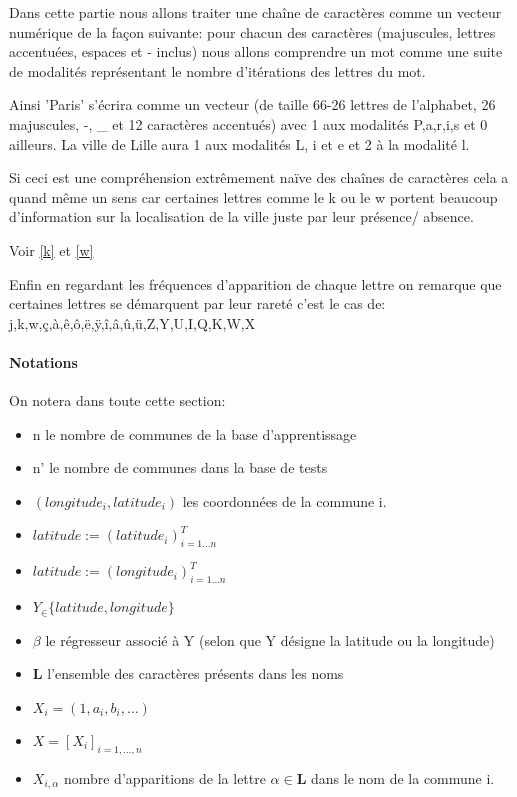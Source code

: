 \documentclass[french]{article}%
\begin{document}
		Dans cette partie nous allons traiter une chaîne de caractères comme un vecteur numérique de la façon suivante: pour chacun des caractères (majuscules, lettres accentuées, espaces et - inclus) nous allons comprendre un mot comme une suite de modalités représentant le nombre d'itérations des lettres du mot.
		
		Ainsi 'Paris' s'écrira comme un vecteur (de taille 66-26 lettres de l'alphabet, 26 majuscules, -, \_ et 12 caractères accentués) avec 1 aux modalités P,a,r,i,s et 0 ailleurs.
		La ville de Lille aura 1 aux modalités L, i et e et 2 à la modalité l.
		
		Si ceci est une compréhension extrêmement naïve des chaînes de caractères cela a quand même un sens car certaines lettres comme le k ou le w portent beaucoup d'information sur la localisation de la ville juste par leur présence/ absence.
		
		Voir \autoref{k} et \autoref{w}
		
		Enfin en regardant les fréquences d'apparition de chaque lettre on remarque que certaines lettres se démarquent par leur rareté c'est le cas de:  j,k,w,ç,à,ê,ô,ë,ÿ,î,â,û,ü,Z,Y,U,I,Q,K,W,X
		
		\paragraph*{Notations}
		
		On notera dans toute cette section: \begin{itemize}
			
			\item n le nombre de communes de la base d'apprentissage
			\item n' le nombre de communes dans la base de tests
			
			\item $(longitude_{i},latitude_{i})$ les coordonnées de la commune i.
			\item$latitude:=(latitude_{i})_{i=1\dots n}^{T}$
			\item $latitude:=(longitude_{i})_{i=1\dots n}^{T}$
			
			\item $Y_ \in \{latitude,longitude\} $
			\item $\beta$ le régresseur associé à Y (selon que Y désigne la latitude ou la longitude)
			
			\item $\mathbf{L}$ l'ensemble des caractères présents dans les noms
			
			\item $X_{i}=(1,a_{i},b_{i},\dots)$
			\item $X=[X_{i}]_{i=1,\dots,n}$
			\item $X_{i,\alpha}$ nombre d'apparitions de la lettre $\alpha\in\mathbf{L}$ dans le nom de la commune i.
			
		\end{itemize}
		
\end{document}
